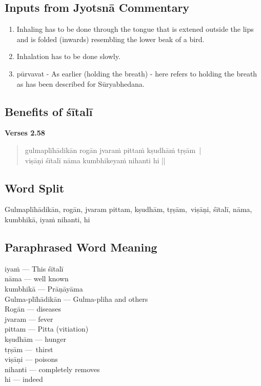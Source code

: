 \subsection*{Inputs from Jyotsnā Commentary}
\vspace{-10pt}

\begin{enumerate}
\itemsep=0pt
\item Inhaling has to be done through the tongue that is extened outside the lips and is folded (inwards) resembling the lower beak of a bird.
\item Inhalation has to be done slowly.
\item pūrvavat - As earlier (holding the breath) - here refers to holding the breath as has been described for Sūryabhedana. 
\end{enumerate}

\subsection*{Benefits of śītalī}


\noindent \textbf{Verses 2.58}

\begin{verse}
gulmaplīhādikān rogān jvaraṁ pittaṁ kṣudhāṁ tṛṣām |\\
viṣāṇi śītalī nāma kumbhikeyaṁ nihanti hi ||
\end{verse}

\subsection*{Word Split}


Gulmaplīhādikān, rogān, jvaram pittam, kṣudhām, tṛṣām, viṣāṇi, śītalī, nāma, kumbhikā, iyaṁ nihanti, hi

\subsection*{Paraphrased Word Meaning}


\begin{multicols}{2}
iyaṁ --- This śītalī \\
nāma --- well known \\
kumbhikā --- Prāṇāyāma\\
Gulma-plīhādikān --- Gulma-pliha and others \\
Rogān --- diseases \\
jvaram --- fever\\
pittam --- Pitta (vitiation)\\
kṣudhām --- hunger \\
tṛṣām --- thirst \\
viṣāṇi --- poisons\\
nihanti --- completely removes\\
hi --- indeed
\end{multicols}

